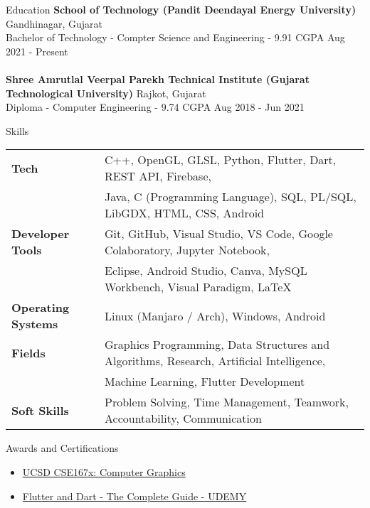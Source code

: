 \documentclass{resume}
\begin{document}
\begin{rSection}{Education}
{\bf School of Technology (Pandit Deendayal Energy University)} \hfill {Gandhinagar, Gujarat}\\
Bachelor of Technology - Compter Science and Engineering - 9.91 CGPA \hfill {Aug 2021 - Present}\\
\\
{\bf Shree Amrutlal Veerpal Parekh Technical Institute (Gujarat Technological University)} \hfill {Rajkot, Gujarat}\\
Diploma - Computer Engineering - 9.74 CGPA \hfill {Aug 2018 - Jun 2021}
\end{rSection}

\begin{rSection}{Skills}
\begin{tabular}{ @{} >{\bfseries}l @{\hspace{5ex}} l }
Tech 
& C++, OpenGL, GLSL, Python, Flutter, Dart, REST API, Firebase, \\ 
& Java, C (Programming Language), SQL, PL/SQL, LibGDX, HTML, CSS, Android
\\
Developer Tools 
& Git, GitHub, Visual Studio, VS Code, Google Colaboratory, Jupyter Notebook, \\
& Eclipse, Android Studio, Canva, MySQL Workbench, Visual Paradigm, LaTeX
\\
Operating Systems 
& Linux (Manjaro / Arch), Windows, Android
\\
Fields 
& Graphics Programming, Data Structures and Algorithms, Research, Artificial Intelligence, \\
& Machine Learning, Flutter Development
\\
Soft Skills 
& Problem Solving, Time Management, Teamwork, Accountability, Communication
\end{tabular}
\end{rSection}

\begin{rSection}{Awards and Certifications} 
\begin{itemize}
    \item   \href{https://courses.edx.org/certificates/3e47add62a6b45269149bf91b91f1399}{UCSD CSE167x: Computer Graphics}
    \item   \href{https://www.udemy.com/certificate/UC-2fce7723-1cc7-403d-a54b-09dbd5cd495e/}{Flutter and Dart - The Complete Guide - UDEMY}
\end{itemize}
\end{rSection}
\end{document}
